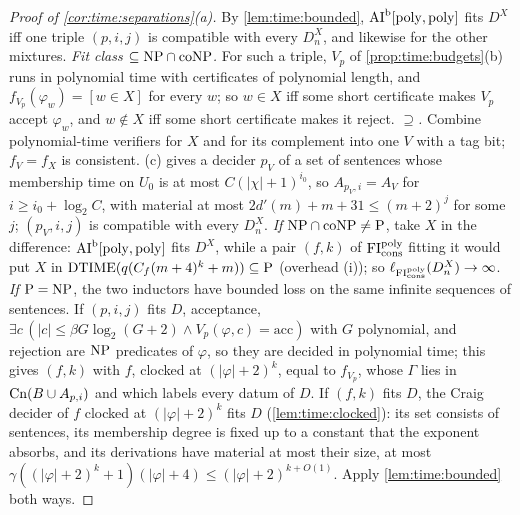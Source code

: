 \begin{proof}[Proof of \cref{cor:time:separations}(a)]
By \cref{lem:time:bounded}, $\mathrm{AI}^{\mathrm b}[\mathrm{poly},\mathrm{poly}]$ fits $D^X$ iff one triple $(p,i,j)$ is compatible with every $D^X_n$, and likewise for the other mixtures.
\emph{Fit class $\subseteq\mathrm{NP}\cap\mathrm{coNP}$.} For such a triple, $V_p$ of \cref{prop:time:budgets}(b) runs in polynomial time with certificates of polynomial length, and $f_{V_p}(\varphi_w)=[w\in X]$ for every $w$; so $w\in X$ iff some short certificate makes $V_p$ accept $\varphi_w$, and $w\notin X$ iff some short certificate makes it reject.
\emph{$\supseteq$.} Combine polynomial-time verifiers for $X$ and for its complement into one $V$ with a tag bit; $f_V=f_X$ is consistent. (c) gives a decider $p_V$ of a set of sentences whose membership time on $U_0$ is at most $C(|\chi|+1)^{i_0}$, so $A_{p_V,i}=A_V$ for $i\ge i_0+\log_2C$, with material at most $2d'(m)+m+31\le(m+2)^j$ for some $j$; $(p_V,i,j)$ is compatible with every $D^X_n$.
\emph{If $\mathrm{NP}\cap\mathrm{coNP}\ne\mathrm{P}$}, take $X$ in the difference: $\mathrm{AI}^{\mathrm b}[\mathrm{poly},\mathrm{poly}]$ fits $D^X$, while a pair $(f,k)$ of $\mathrm{FI}_{\mathrm{cons}}^{\mathrm{poly}}$ fitting it would put $X$ in $\mathrm{DTIME}(q(C_f(m+4)^k+m))\subseteq\mathrm{P}$ (overhead (i)); so $\ell_{\mathrm{FI}_{\mathrm{cons}}^{\mathrm{poly}}}(D^X_n)\to\infty$.
\emph{If $\mathrm{P}=\mathrm{NP}$}, the two inductors have bounded loss on the same infinite sequences of sentences. If $(p,i,j)$ fits $D$, acceptance, $\exists c\,(|c|\le\beta G\log_2(G+2)\wedge V_p(\varphi,c)=\mathrm{acc})$ with $G$ polynomial, and rejection are $\mathrm{NP}$ predicates of $\varphi$, so they are decided in polynomial time; this gives $(f,k)$ with $f$, clocked at $(|\varphi|+2)^k$, equal to $f_{V_p}$, whose $\Gamma$ lies in $\mathrm{Cn}(B\cup A_{p,i})$ and which labels every datum of $D$. If $(f,k)$ fits $D$, the Craig decider of $f$ clocked at $(|\varphi|+2)^k$ fits $D$ (\cref{lem:time:clocked}): its set consists of sentences, its membership degree is fixed up to a constant that the exponent absorbs, and its derivations have material at most their size, at most $\gamma((|\varphi|+2)^k+1)(|\varphi|+4)\le(|\varphi|+2)^{k+O(1)}$. Apply \cref{lem:time:bounded} both ways.

\end{proof}
